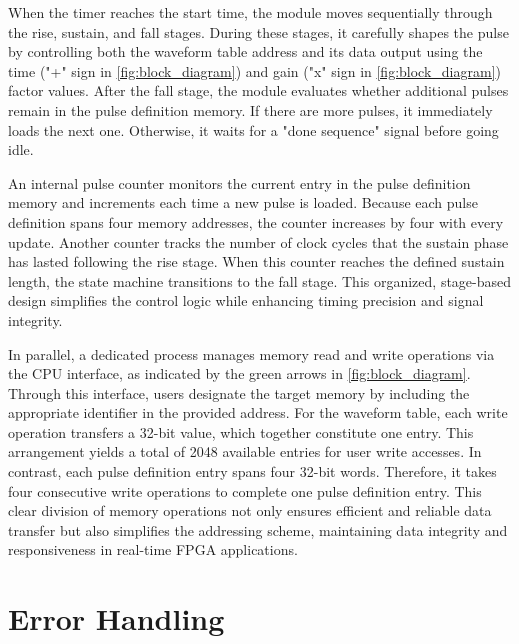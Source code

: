 When the timer reaches the start time, the module moves sequentially through the rise, sustain, and fall stages. During these stages, it carefully shapes the pulse by controlling both the waveform table address and its data output using the time ("+" sign in \autoref{fig:block_diagram}) and gain ("x" sign in \autoref{fig:block_diagram}) factor values. After the fall stage, the module evaluates whether additional pulses remain in the pulse definition memory. If there are more pulses, it immediately loads the next one. Otherwise, it waits for a "done sequence" signal before going idle.

An internal pulse counter monitors the current entry in the pulse definition memory and increments each time a new pulse is loaded. Because each pulse definition spans four memory addresses, the counter increases by four with every update. Another counter tracks the number of clock cycles that the sustain phase has lasted following the rise stage. When this counter reaches the defined sustain length, the state machine transitions to the fall stage. This organized, stage-based design simplifies the control logic while enhancing timing precision and signal integrity. 

In parallel, a dedicated process manages memory read and write operations via the CPU interface, as indicated by the green arrows in \autoref{fig:block_diagram}. Through this interface, users designate the target memory by including the appropriate identifier in the provided address. For the waveform table, each write operation transfers a 32-bit value, which together constitute one entry. This arrangement yields a total of 2048 available entries for user write accesses. In contrast, each pulse definition entry spans four 32-bit words. Therefore, it takes four consecutive write operations to complete one pulse definition entry. This clear division of memory operations not only ensures efficient and reliable data transfer but also simplifies the addressing scheme, maintaining data integrity and responsiveness in real-time FPGA applications.

\section{Error Handling}

